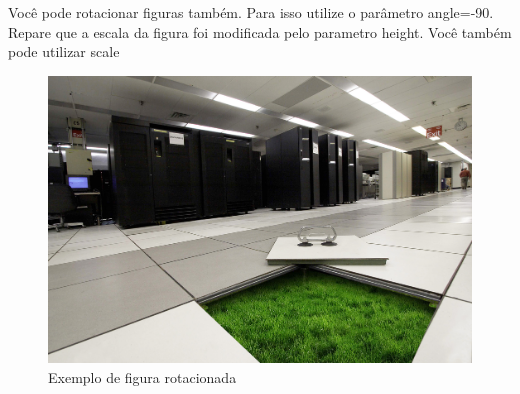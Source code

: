 \documentclass[	DIV=calc,%
							paper=a4,%
							fontsize=12pt,%
							onecolumn]{scrartcl}	 					%
\begin{document}
Você pode rotacionar figuras também. Para isso utilize o parâmetro angle=-90. Repare que a escala da figura foi modificada pelo parametro height. Você também pode utilizar scale

\begin{figure}
	\centering
	\includegraphics[height=\textwidth,angle=-90]{fig3}
	\caption{Exemplo de figura rotacionada}
	\label{fig3}
\end{figure}


\end{document}
